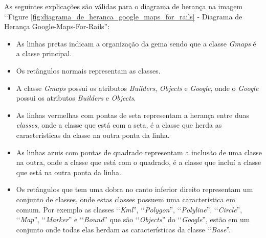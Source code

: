 As seguintes explicações são válidas para o diagrama de herança na imagem ‘‘Figure 
\ref{fig:diagrama_de_heranca_google_maps_for_rails} - Diagrama de Herança Google-Maps-For-Rails'':

\begin{itemize}

 \item As linhas pretas indicam a organização da gema sendo que a classe \emph{Gmaps} é a classe principal.
 
 \item Os retângulos normais representam as classes.
 
 \item A classe \emph{Gmaps} possui os atributos \emph{Builders}, \emph{Objects} e 
 \emph{Google}, onde o \emph{Google} possui os atributos \emph{Builders} e \emph{Objects}.
 
 \item As linhas vermelhas com pontas de seta representam a herança entre duas \emph{classes}, onde 
 a classe que está com a seta, é a classe que herda as características da classe
 na outra ponta da linha.

 \item As linhas azuis com pontas de quadrado representam a inclusão de uma classe na outra, onde
 a classe que está com o quadrado, é a classe que incluí a classe que está na outra ponta da linha.
 
  \item Os retângulos que tem uma dobra no canto inferior direito representam um conjunto de classes, 
 onde estas classes possuem uma característica em comum. Por exemplo as classes ‘‘\emph{Kml}'', 
 ‘‘\emph{Polygon}'', ‘‘\emph{Polyline}'', ‘‘\emph{Circle}'', ‘‘\emph{Map}'', ‘‘\emph{Marker}'' e 
 ‘‘\emph{Bound}'' que são ‘‘\emph{Objects}'' do ‘‘\emph{Google}'', estão em um conjunto onde todas elas 
 herdam as características da classe ‘‘\emph{Base}''.
 
 \end{itemize}
 
